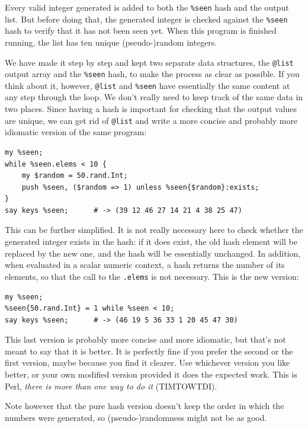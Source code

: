 Every valid integer generated is added to both the \verb'%seen' 
hash and the output list. But before doing 
that, the generated integer is checked against the 
\verb'%seen' hash to verify that it has not been seen yet. 
When this program is finished running, the list has ten unique (pseudo-)random integers.

We have made it step by step and kept two separate data 
structures, the \verb'@list' output array and the 
\verb'%seen' hash, to make the process as clear as possible. 
If you think about it, however, \verb'@list' and \verb'%seen' 
have essentially the same content at any step through the 
loop. We don't really need to keep track of the same data in 
two places. Since having a hash is important for checking that the 
output values are unique, we can get rid of \verb'@list' 
and write a more concise and probably more idiomatic version 
of the same program:

\begin{verbatim}
my %seen;
while %seen.elems < 10 {
	my $random = 50.rand.Int;
	push %seen, ($random => 1) unless %seen{$random}:exists;
}
say keys %seen;      # -> (39 12 46 27 14 21 4 38 25 47)
\end{verbatim}

This can be further simplified. It is not really necessary 
here to check whether the generated integer exists in the 
hash: if it does exist, the old hash element will be replaced 
by the new one, and the hash will be essentially unchanged. In 
addition, when evaluated in a scalar numeric context, a 
hash returns the number of its elements, so that the call 
to the {\tt .elems} is not necessary. This is the new version:

\begin{verbatim}
my %seen;
%seen{50.rand.Int} = 1 while %seen < 10;
say keys %seen;      # -> (46 19 5 36 33 1 20 45 47 30)
\end{verbatim}

This last version is probably more concise and more idiomatic, 
but that's not meant to say that it is better. It is 
perfectly fine if you prefer the second or the first version, 
maybe because you find it clearer. Use whichever version you 
like better, or your own modified version provided it does 
the expected work. This is Perl, \emph{there 
is more than one way to do it} (TIMTOWTDI).

Note however that the pure hash version doesn't keep the order 
in which the numbers were generated, so (pseudo-)randomness 
might not be as good.

